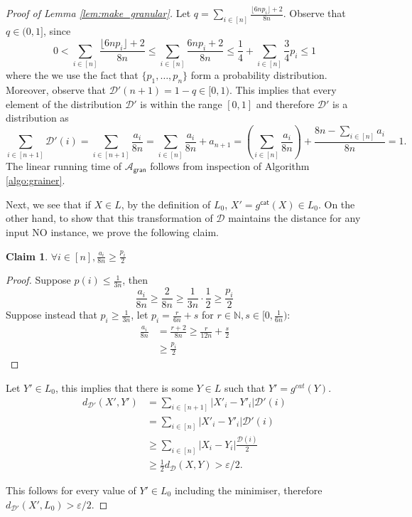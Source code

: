 \documentclass[10pt,a4paper]{article}
\newtheorem{claim}[theorem]{Claim}
\newcommand{\N}{\mathbb{N}}
\newcommand{\sD}{\mathcal{D}}
\newcommand{\sA}{\mathcal{A}}
\begin{document}
\begin{proof}[Proof of Lemma \ref{lem:make_granular}]
Let $q=\sum_{i\in [n]}\frac{\lfloor 6n p_{i}\rfloor+2}{8n}$. Observe that $q \in (0,1]$, since 
\begin{equation*}
    0 < \sum_{i\in [n]} \frac{\lfloor 6n p_{i}\rfloor+2}{8n} \leq \sum_{i\in [n]}\frac{ 6n p_{i}+2}{8n} \leq \frac{1}{4} + \sum_{i\in [n]} \frac{3}{4} p_{i} \leq 1
\end{equation*}
where the we use the fact that $\{p_1, \dots, p_n \}$ form a probability distribution. Moreover, observe that $\sD'(n+1) = 1-q \in [0,1)$. This implies that every element of the distribution $\sD'$ is within the range $[0,1]$ and therefore $\sD'$ is a distribution as 
\begin{equation*}
    \sum_{i\in[n+1]}\sD'(i)=\sum_{i\in[n+1]}\frac{a_{i}}{8n}=\sum_{i\in[n]}\frac{a_{i}}{8n}+a_{n+1}=\left(\sum_{i\in[n]}\frac{a_{i}}{8n}\right)+\frac{8n-\sum_{i\in[n]}a_{i}}{8n}=1.
\end{equation*}
The linear running time of $\sA_{\textsf{gran}}$ follows from inspection of Algorithm \ref{algo:grainer}.

Next, we see that if $X\in L$, by the definition of $L_{0}$, $X'=g^{\mathsf{cat}}(X)\in L_{0}$. On the other hand, to show that this transformation of $\sD$ maintains the distance for any input NO instance, we prove the following claim.
\begin{claim}
    $\forall i\in[n], \frac{a_{i}}{8n}\geq \frac{p_{i}}{2}$ 
\end{claim}
\begin{proof}
    Suppose $p(i)\leq \frac{1}{3n}$, then
    \[
        \frac{a_{i}}{8n}\geq \frac{2}{8n} \geq \frac{1}{3n}\cdot \frac{1}{2} \geq \frac{p_{i}}{2}
    \]
    Suppose instead that $p_{i}\geq \frac{1}{3n}$, let $p_{i}=\frac{r}{6n}+s$ for $r\in \N, s\in[0,\frac{1}{6n})$:
     \[
    \begin{split}
        \frac{a_{i}}{8n}&=\frac{r+2}{8n} \geq \frac{r}{12n}+ \frac{s}{2}\\
        &\geq \frac{p_{i}}{2}
    \end{split}
    \]
\end{proof}

Let $Y'\in L_{0}$, this implies that there is some $Y\in L$ such that $Y'=g^{cat}(Y)$. 
\[\begin{split}
    d_{\sD'}(X',Y')&= \sum_{i\in [n+1]}|X'_{i}-Y'_{i}|\sD'(i)\\
    &= \sum_{i\in [n]}|X'_{i}-Y'_{i}|\sD'(i)\\
    &\geq \sum_{i\in [n]}|X_{i}-Y_{i}|\frac{\sD(i)}{2}\\
    &\geq \frac{1}{2}d_{\sD}(X,Y) > \varepsilon/2.
\end{split}\]

This follows for every value of $Y'\in L_{0}$ including the minimiser, therefore $d_{\sD'}(X',L_{0})>\varepsilon/2$.
\end{proof}
\end{document}

